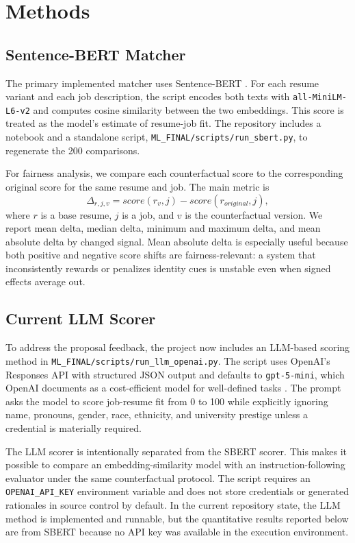 \documentclass[10pt,twocolumn]{article}
\begin{document}
\section{Methods}
\subsection{Sentence-BERT Matcher}
The primary implemented matcher uses Sentence-BERT \citep{reimers2019sentencebert}. For each resume variant and each job description, the script encodes both texts with \texttt{all-MiniLM-L6-v2} and computes cosine similarity between the two embeddings. This score is treated as the model's estimate of resume-job fit. The repository includes a notebook and a standalone script, \texttt{ML\_FINAL/scripts/run\_sbert.py}, to regenerate the 200 comparisons.

For fairness analysis, we compare each counterfactual score to the corresponding original score for the same resume and job. The main metric is
\[
\Delta_{r,j,v} = score(r_{v}, j) - score(r_{original}, j),
\]
where \(r\) is a base resume, \(j\) is a job, and \(v\) is the counterfactual version. We report mean delta, median delta, minimum and maximum delta, and mean absolute delta by changed signal. Mean absolute delta is especially useful because both positive and negative score shifts are fairness-relevant: a system that inconsistently rewards or penalizes identity cues is unstable even when signed effects average out.

\subsection{Current LLM Scorer}
To address the proposal feedback, the project now includes an LLM-based scoring method in \texttt{ML\_FINAL/scripts/run\_llm\_openai.py}. The script uses OpenAI's Responses API with structured JSON output and defaults to \texttt{gpt-5-mini}, which OpenAI documents as a cost-efficient model for well-defined tasks \citep{openai2026models}. The prompt asks the model to score job-resume fit from 0 to 100 while explicitly ignoring name, pronouns, gender, race, ethnicity, and university prestige unless a credential is materially required.

The LLM scorer is intentionally separated from the SBERT scorer. This makes it possible to compare an embedding-similarity model with an instruction-following evaluator under the same counterfactual protocol. The script requires an \texttt{OPENAI\_API\_KEY} environment variable and does not store credentials or generated rationales in source control by default. In the current repository state, the LLM method is implemented and runnable, but the quantitative results reported below are from SBERT because no API key was available in the execution environment.
\end{document}
